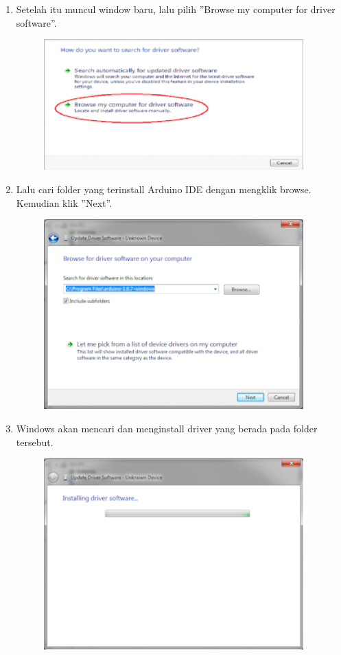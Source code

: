 \begin{enumerate}
\begin{figure}[H]
		\centering
	\end{figure}
	\item Setelah itu muncul window baru, lalu pilih ''Browse my computer for driver software''.
	\begin{figure}[H]
		\includegraphics[width=10cm]{figures/5/1174086/Teori/6.png}
		\centering
	\end{figure}
	\item Lalu cari folder yang terinstall Arduino IDE dengan mengklik browse. Kemudian klik ''Next''.
	\begin{figure}[H]
		\includegraphics[width=10cm]{figures/5/1174086/Teori/7.png}
		\centering
	\end{figure}
	\item Windows akan mencari dan menginstall driver yang berada pada folder tersebut.
	\begin{figure}[H]
		\includegraphics[width=10cm]{figures/5/1174086/Teori/8.png}

\end{figure}
\end{enumerate}
